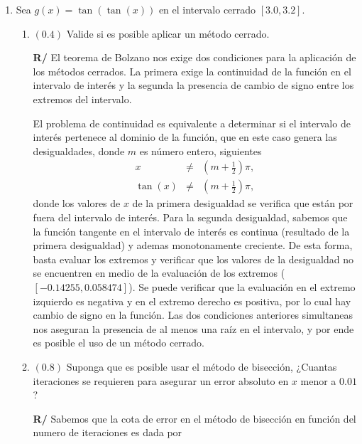 \documentclass[12pt]{article}
\begin{document}
\begin{enumerate}[leftmargin=*,widest=9]
\begin{enumerate}[label=\alph*]
   \end{enumerate}
   
   \item Sea \(g(x) = \tan(\tan(x)) \) en el intervalo cerrado \( [3.0, 3.2] \).
   \begin{enumerate}[label=\alph*]
   
   \item \((0.4)\) Valide si es posible aplicar un método cerrado.
   
   
\textbf{R/} El teorema de Bolzano nos exige dos condiciones para la aplicación de los métodos cerrados. La primera exige la continuidad de la función en el intervalo de interés y la segunda la presencia de cambio de signo entre los extremos del intervalo.
   
El problema de continuidad es equivalente a determinar si el intervalo de interés pertenece al dominio de la función, que en este caso genera las desigualdades, donde \(m\) es número entero, siguientes
\begin{eqnarray*}
x & \neq & \left(m + \frac{1}{2} \right) \pi, \\
\tan(x) & \neq & \left(m + \frac{1}{2} \right) \pi,
\end{eqnarray*}
donde los valores de \(x\) de la primera desigualdad se verifica que están por fuera del intervalo de interés. Para la segunda desigualdad, sabemos que la función tangente en el intervalo de interés es continua (resultado de la primera desigualdad) y ademas monotonamente creciente. De esta forma, basta evaluar los extremos y verificar que los valores de la desigualdad no se encuentren en medio de la evaluación de los extremos (\([-0.14255, 0.058474]\)).
Se puede verificar que la evaluación en el extremo izquierdo es negativa y en el extremo derecho es positiva, por lo cual hay cambio de signo en la función.
Las dos condiciones anteriores simultaneas nos aseguran la presencia de al menos una raíz en el intervalo, y por ende es posible el uso de un método cerrado.
   
   \item \((0.8)\) Suponga que es posible usar el método de bisección, ¿Cuantas iteraciones se requieren para asegurar un error absoluto en \(x\) menor a \(0.01\) ?
   
   
\textbf{R/} Sabemos que la cota de error en el método de bisección en función del numero de iteraciones es dada por 
   

\end{enumerate}
\end{enumerate}
\end{document}
